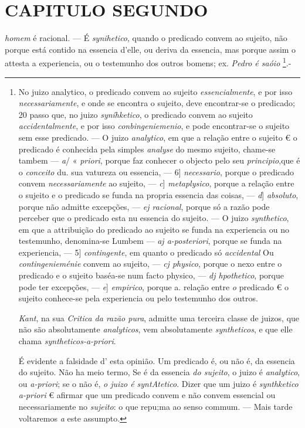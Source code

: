 
\chapter*{CAPITULO SEGUNDO}

 \emph{homem} é racional. --- É \emph{synihetico}, quando o predicado convem ao sujeito, não porque está contido na essencia d'elle, ou deriva da essencia, mas porque assim o attesta a experiencia, ou o testemunho dos outros bomens; ex. \emph{Pedro é saóio} \footnote{No juizo analytico, o predicado convem ao sujeito \emph{essencialmente}, \textbar{} e por isso \emph{necessariamente}, e onde se encontra o sujeito, deve encontrar-se o predicado; 20 passo que, no juizo \emph{syníhketico}, o predicado convem ao sujeito \emph{accidentalmente}, e por isso \emph{conbingeniemenio}, e pode encontrar-se o sujeito sem esse predicado. --- O juizo \emph{analytico}, em que a relação entre o sujeito € o predicado é conhecida pela simples \emph{analyse} do mesmo sujeito, chame-se tambem --- \emph{a}/ « \emph{priori}, porque faz conhecer o objecto pelo seu \emph{principio},que é o \emph{conceito} du. sua vatureza ou essencia, --- 6] \emph{necessario}, porque o predicado convem \emph{necessariamente} ao sujeito, --- \emph{c}] \emph{metaplysico}, porque a relação entre o sujeito e o predicado se funda na propria essencia das coisas, --- \emph{d}] \emph{absoluto}, porque não admitte excepções, --- \emph{ej racional}, porque só a razão pode perceber que o predicado esta nu essencia do sujeito. --- O juizo \emph{synthetico}, em que a attribuição do predicado ao sujeito se funda na experiencia ou no testemunho, denomina-se Lumbem --- \emph{aj a-posteriori}, porque se funda na experiencia, --- 5] \emph{contingente}, em quanto o predicado só \emph{accidental} Ou \emph{contingenieménie} convem ao sujeito, --- \emph{cj physico}, porque o nexo entre o predicado e o sujeito baséa-se num facto physico, --- \emph{dj hpothetico}, porque pode ter excepções, --- \emph{e}] \emph{empirico}, porque a. relação entre \emph{o} predicado € o sujeito conhece-se pela experiencia ou pelo testemunho dos outros.\par \emph{Kant}, na sua \emph{Critica da razão pura}, admitte uma terceira classe de juizos, que não são absolutamente \emph{analyticos}, vem absolutamente \emph{syntheticos}, e que elle chama \emph{syntheticos-a-priori}.\par É evidente a falsidade d' esta opinião. Um predicado é, ou não é, da essencia do sujeito. Não ha meio termo, Se é da essencia \emph{do sujeito}, o juizo é \emph{analytico}, ou \emph{a-priori}; se o não é, \emph{o juizo é syntAtetico}. Dizer que um juizo é \emph{synthketico a-priori} € afirmar que um predicado convem e não convem essencial ou necessariamente no \emph{sujeito}: o que repu;ma ao senso commum. --- Mais tarde voltaremos \emph{a} este assumpto.}.-

